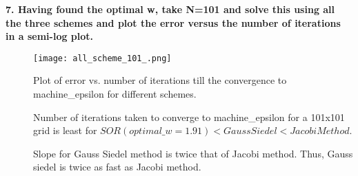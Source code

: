 \documentclass{article}
\begin{document}
\newpage
\textbf{7. Having found the optimal w, take N=101 and solve this using all the three schemes and plot the error versus the number of iterations in a semi-log plot.}

\begin{figure}[H] \label{figure}
\texttt{[image: all\_scheme\_101\_.png]}
\caption{Plot of error vs. number of iterations till the convergence to machine\_epsilon for different schemes.}
\label{figure:}
\end{figure}

\begin{description}
\item[]Number of iterations taken to converge to machine\_epsilon for a 101x101 grid is least for $SOR (optimal\_w = 1.91) < Gauss Siedel < Jacobi Method$.
\item[]Slope for Gauss Siedel method is twice that of Jacobi method. Thus, Gauss siedel is twice as fast as Jacobi method.
\end{description}
\end{document}
